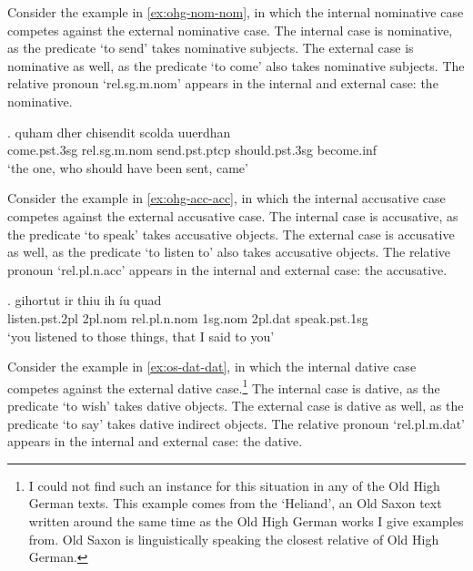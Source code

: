 Consider the example in \ref{ex:ohg-nom-nom}, in which the internal nominative case competes against the external nominative case.
The internal case is nominative, as the predicate  `to send' takes nominative subjects.
The external case is nominative as well, as the predicate  `to come' also takes nominative subjects.
The relative pronoun  `\ac{rel}.\ac{sg}.\ac{m}.\ac{nom}' appears in the internal and external case: the nominative.

\exg. quham dher chisendit scolda uuerdhan\\
 come.\ac{pst}.3\ac{sg}\scsub{[nom]} \ac{rel}.\ac{sg}.\ac{m}.\ac{nom} send.\ac{pst}.\ac{ptcp}\scsub{[nom]} should.\ac{pst}.3\ac{sg} become.\ac{inf}\\
 `the one, who should have been sent, came' \label{ex:ohg-nom-nom}

Consider the example in \ref{ex:ohg-acc-acc}, in which the internal accusative case competes against the external accusative case.
The internal case is accusative, as the predicate  `to speak' takes accusative objects.
The external case is accusative as well, as the predicate  `to listen to' also takes accusative objects.
The relative pronoun  `\ac{rel}.\ac{pl}.\ac{n}.\ac{acc}' appears in the internal and external case: the accusative.

\exg. gihortut ir thiu ih íu quad\\
 listen.\ac{pst}.2\ac{pl}\scsub{[acc]} 2\ac{pl}.\ac{nom} \ac{rel}.\ac{pl}.\ac{n}.\ac{nom} 1\ac{sg}.\ac{nom} 2\ac{pl}.\ac{dat} speak.\ac{pst}.1\ac{sg}\scsub{[acc]}\\
 `you listened to those things, that I said to you' \label{ex:ohg-acc-acc}

Consider the example in \ref{ex:os-dat-dat}, in which the internal dative case competes against the external dative case.\footnote{
I could not find such an instance for this situation in any of the Old High German texts. This example comes from the `Heliand', an Old Saxon text written around the same time as the Old High German works I give examples from. Old Saxon is linguistically speaking the closest relative of Old High German.
}
The internal case is dative, as the predicate  `to wish' takes dative objects.
The external case is dative as well, as the predicate  `to say' takes dative indirect objects.
The relative pronoun  `\ac{rel}.\ac{pl}.\ac{m}.\ac{dat}' appears in the internal and external case: the dative.

